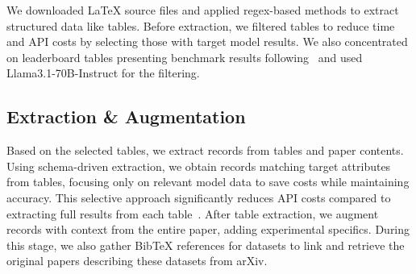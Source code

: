 We downloaded LaTeX source files and applied regex-based methods to extract structured data like tables.
Before extraction, we filtered tables to reduce time and API costs by selecting those with target model results.
We also concentrated on leaderboard tables presenting benchmark results following~\citet{kardas2020axcell} and used Llama3.1-70B-Instruct \citep{dubey2024llama} for the filtering.


\subsection{Extraction \& Augmentation}
\label{subsection:extraction}


Based on the selected tables, we extract records from tables and paper contents. 
Using schema-driven extraction, we obtain records matching target attributes from tables, focusing only on relevant model data to save costs while maintaining accuracy. 
This selective approach significantly reduces API costs compared to extracting full results from each table~\citep{bai2023schema}. 
After table extraction, we augment records with context from the entire paper, adding experimental specifics. 
During this stage, we also gather BibTeX references for datasets to link and retrieve the original papers describing these datasets from arXiv.

